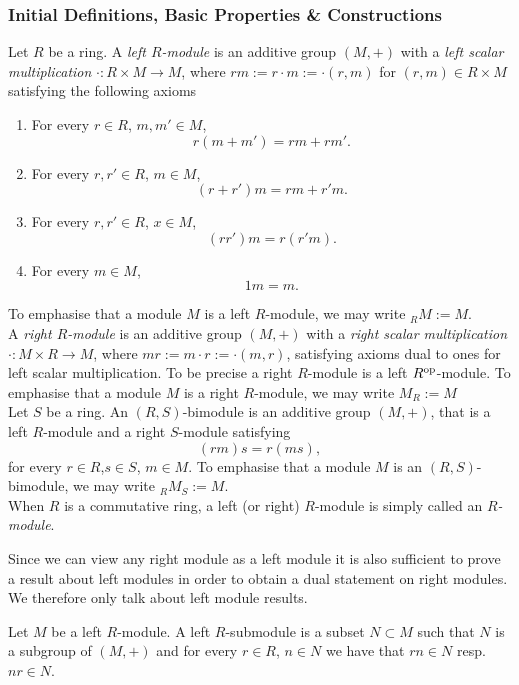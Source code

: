 \subsubsection{Initial Definitions, Basic Properties \& Constructions}
\begin{definition}
    Let $R$ be a ring. A \textit{left $R$-module} is an additive group $(M,+)$ with a \textit{left scalar multiplication} $\cdot : R \times M \rightarrow M$, where $rm := r\cdot m := \cdot(r,m)$ for $(r,m)\in R\times M$ satisfying the following axioms
    \begin{enumerate}
        \item For every $r\in R$, $m,m'\in M$,
        $$r(m+m')=rm+rm'.$$
        \item For every $r,r'\in R$, $m\in M$,
        $$(r+r')m = rm+r'm.$$
        \item For every $r,r'\in R$, $x\in M$,
        $$(rr')m=r(r'm).$$
        \item For every $m\in M$,
        $$1m = m.$$
    \end{enumerate}
    To emphasise that a module $M$ is a left $R$-module, we may write $_RM:= M$.\\
    A \textit{right $R$-module} is an additive group $(M,+)$ with a \textit{right scalar multiplication} $\cdot : M\times R \rightarrow M$, where $mr := m\cdot r := \cdot(m,r)$, satisfying axioms dual to ones for left scalar multiplication. To be precise a right $R$-module is a left $R^\mathrm{op}$-module. To emphasise that a module $M$ is a right $R$-module, we may write $M_R := M$\\
    Let $S$ be a ring. An $(R,S)$-bimodule is an additive group $(M,+)$, that is a left $R$-module and a right $S$-module satisfying 
    $$(rm)s = r(ms),$$
    for every $r\in R$,$s\in S$, $m\in M$. To emphasise that a module $M$ is an $(R,S)$-bimodule, we may write $_RM_S := M$.\\
    When $R$ is a commutative ring, a left (or right) $R$-module is simply called an \emph{$R$-module}.
\end{definition}
Since we can view any right module as a left module it is also sufficient to prove a result about left modules in order to obtain a dual statement on right modules. We therefore only talk about left module results. 
\begin{definition}
    Let $M$ be a left $R$-module. A left $R$-submodule is a subset $N\subset M$ such that $N$ is a subgroup of $(M,+)$ and for every $r\in R$, $n\in N$ we have that $rn\in N$ resp. $nr \in N$.
\end{definition}
